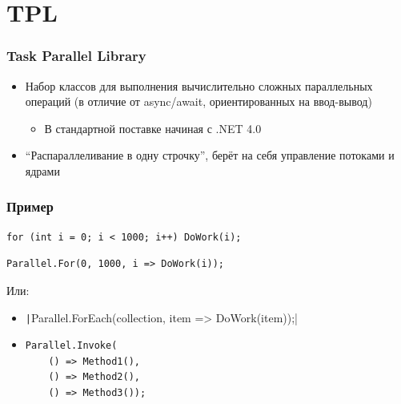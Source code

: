 \documentclass{../../slides-style}
\begin{document}
    \section{TPL}

    \begin{frame}
        \frametitle{Task Parallel Library}
        \begin{itemize}
            \item Набор классов для выполнения вычислительно сложных параллельных операций (в отличие от async/await, ориентированных на ввод-вывод)
            \begin{itemize}
                \item В стандартной поставке начиная с .NET 4.0
            \end{itemize}
            \item ``Распараллеливание в одну строчку'', берёт на себя управление потоками и ядрами
        \end{itemize}
    \end{frame}

    \begin{frame}[fragile]
        \frametitle{Пример}
        \begin{verbatim}
for (int i = 0; i < 1000; i++) DoWork(i);
        \end{verbatim}
        \DownArrow
        \begin{verbatim}
Parallel.For(0, 1000, i => DoWork(i));
        \end{verbatim}

        Или:
        \begin{itemize}
            \item \texttt|Parallel.ForEach(collection, item => DoWork(item));|
            \item 
                \begin{verbatim}
Parallel.Invoke(
    () => Method1(),
    () => Method2(),
    () => Method3());
                \end{verbatim}
        \end{itemize}
    \end{frame}
\end{document}
